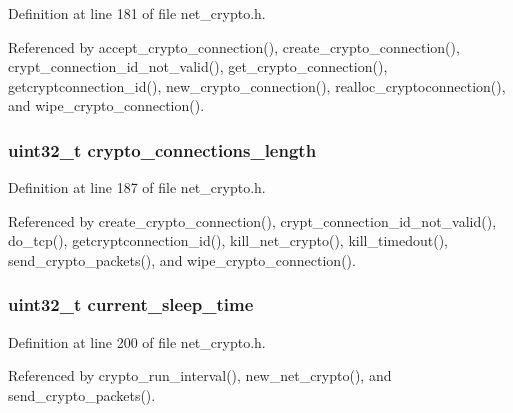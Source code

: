 Definition at line 181 of file net\+\_\+crypto.\+h.



Referenced by accept\+\_\+crypto\+\_\+connection(), create\+\_\+crypto\+\_\+connection(), crypt\+\_\+connection\+\_\+id\+\_\+not\+\_\+valid(), get\+\_\+crypto\+\_\+connection(), getcryptconnection\+\_\+id(), new\+\_\+crypto\+\_\+connection(), realloc\+\_\+cryptoconnection(), and wipe\+\_\+crypto\+\_\+connection().

\hypertarget{struct_net___crypto_a9c91c3c65885a2bd39d0f864b9a5ddb9}{
\subsubsection[{crypto\+\_\+connections\+\_\+length}]{\setlength{\rightskip}{0pt plus 5cm}uint32\+\_\+t crypto\+\_\+connections\+\_\+length}}\label{struct_net___crypto_a9c91c3c65885a2bd39d0f864b9a5ddb9}


Definition at line 187 of file net\+\_\+crypto.\+h.



Referenced by create\+\_\+crypto\+\_\+connection(), crypt\+\_\+connection\+\_\+id\+\_\+not\+\_\+valid(), do\+\_\+tcp(), getcryptconnection\+\_\+id(), kill\+\_\+net\+\_\+crypto(), kill\+\_\+timedout(), send\+\_\+crypto\+\_\+packets(), and wipe\+\_\+crypto\+\_\+connection().

\hypertarget{struct_net___crypto_a86823a02e323235811eada4755e3f81e}{
\subsubsection[{current\+\_\+sleep\+\_\+time}]{\setlength{\rightskip}{0pt plus 5cm}uint32\+\_\+t current\+\_\+sleep\+\_\+time}}\label{struct_net___crypto_a86823a02e323235811eada4755e3f81e}


Definition at line 200 of file net\+\_\+crypto.\+h.



Referenced by crypto\+\_\+run\+\_\+interval(), new\+\_\+net\+\_\+crypto(), and send\+\_\+crypto\+\_\+packets().

